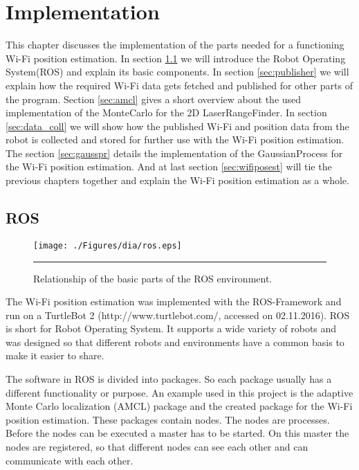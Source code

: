\chapter{Implementation} %
\label{Chapter3}
This chapter discusses the implementation of the parts needed for a functioning Wi-Fi position estimation. In section \ref{sec:ros} we will introduce the Robot Operating System(ROS) and explain its basic components.
In section \ref{sec:publisher} we will explain how the required Wi-Fi data gets fetched and published for other parts of the program.
Section \ref{sec:amcl} gives a short overview about the used implementation of the \Gls{MonteCarlo} for the 2D \gls{LaserRangeFinder}.
In section \ref{sec:data_coll} we will show how the published Wi-Fi and position data from the robot is collected and stored for further use with the Wi-Fi position estimation.
The section \ref{sec:gausspr} details the implementation of the \Gls{GaussianProcess} for the Wi-Fi position estimation.
And at last section \ref{sec:wifiposest} will tie the previous chapters together and explain the Wi-Fi position estimation as a whole.

\section{ROS}\label{sec:ros}
\begin{figure}[htbp]
	\centering
		\texttt{[image: ./Figures/dia/ros.eps]}
		\rule{35em}{0.5pt}
	\caption[Diagram of basic concepts in ROS]{Relationship of the basic parts of the ROS environment.}
	\label{fig:ros_architecture}
\end{figure}
The Wi-Fi position estimation was implemented with the ROS-Framework and run on a TurtleBot 2 (http://www.turtlebot.com/, accessed on 02.11.2016). ROS \citep{Fernandez:2015:LRR:2876174} \citep{288} is short for Robot Operating System. It supports a wide variety of robots and was designed so that different robots and environments have a common basis to make it easier to share. 

The software in ROS is divided into packages. So each package usually has a different functionality or purpose. An example used in this project is the adaptive Monte Carlo localization (AMCL) package and the created package for the Wi-Fi position estimation. These packages contain nodes. The nodes are processes. Before the nodes can be executed a master has to be started. On this master the nodes are registered, so that different nodes can see each other and can communicate with each other. 

